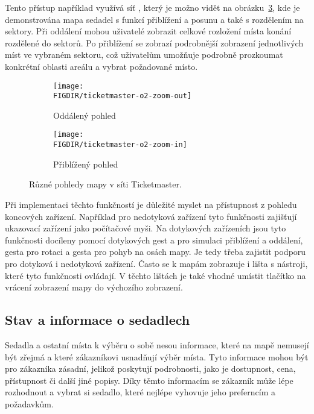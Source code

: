 Tento přístup například využívá síť , který je možno vidět na obrázku~\ref{fig:ticketmaster-o2-zoom}, kde je demonstrována mapa sedadel s funkcí přiblížení a posunu a také s rozdělením na sektory.
Při oddálení mohou uživatelé zobrazit celkové rozložení místa konání rozdělené do sektorů.
Po přiblížení se zobrazí podrobnější zobrazení jednotlivých míst ve vybraném sektoru, což uživatelům umožňuje podrobně prozkoumat konkrétní oblasti areálu a vybrat požadované místo.

\begin{figure}[H]
    \centering
    \begin{subfigure}{0.45\textwidth}
        \texttt{[image: \\FIGDIR/ticketmaster-o2-zoom-out]}
        \caption{Oddálený pohled}
        \label{fig:ticketmaster-o2-zoom-in}
    \end{subfigure}
    \hfill
    \begin{subfigure}{0.45\textwidth}
        \texttt{[image: \\FIGDIR/ticketmaster-o2-zoom-in]}
        \caption{Přiblížený pohled}
        \label{fig:ticketmaster-o2-zoom-out}
    \end{subfigure}

    \caption{Různé pohledy mapy v síti Ticketmaster.}
    \label{fig:ticketmaster-o2-zoom}
\end{figure}

Při implementaci těchto funkčností je důležité myslet na přístupnost z pohledu koncových zařízení.
Například pro nedotyková zařízení tyto funkčnosti zajišťují ukazovací zařízení jako počítačové myši.
Na dotykových zařízeních jsou tyto funkčnosti docíleny pomocí dotykových gest  a  pro simulaci přiblížení a oddálení, gesta  pro rotaci a gesta  pro pohyb na osách mapy.
Je tedy třeba zajistit podporu pro dotyková i nedotyková zařízení.
Často se k mapám zobrazuje i lišta s nástroji, které tyto funkčnosti ovládají.
V těchto lištách je také vhodné umístit tlačítko na vrácení zobrazení mapy do výchozího zobrazení.

\subsection{Stav a informace o sedadlech}
\label{sec:specifikace-interaktivni-mapa-stav-a-informace-o-sedadlech}
Sedadla a ostatní místa k výběru o sobě nesou informace, které na mapě nemusejí být zřejmá a které zákazníkovi usnadňují výběr místa.
Tyto informace mohou být pro zákazníka zásadní, jelikož poskytují podrobnosti, jako je dostupnost, cena, přístupnost či další jiné popisy.
Díky těmto informacím se zákazník může lépe rozhodnout a vybrat si sedadlo, které nejlépe vyhovuje jeho preferncím a požadavkům.

